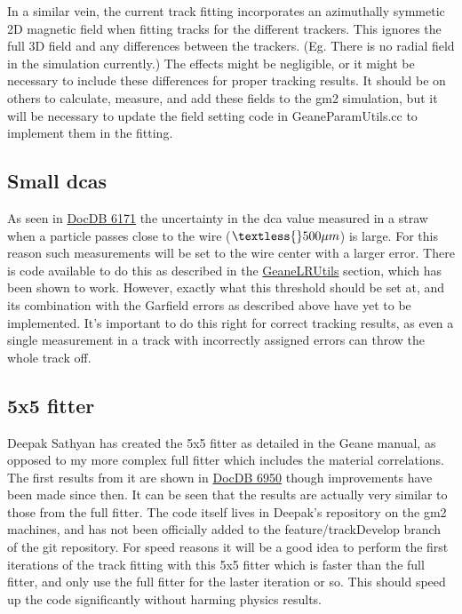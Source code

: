 		In a similar vein, the current track fitting incorporates an azimuthally symmetic 2D magnetic field when fitting tracks for the different trackers. This ignores the full 3D field and any differences between the trackers. (Eg. There is no radial field in the simulation currently.) The effects might be negligible, or it might be necessary to include these differences for proper tracking results. It should be on others to calculate, measure, and add these fields to the gm2 simulation, but it will be necessary to update the field setting code in GeaneParamUtils.cc to implement them in the fitting.

	\subsection{Small dcas}

		As seen in \href{https://gm2-docdb.fnal.gov/cgi-bin/private/ShowDocument?docid=6171}{DocDB 6171} the uncertainty in the dca value measured in a straw when a particle passes close to the wire ($\textless{}500 \mu m$) is large. For this reason such measurements will be set to the wire center with a larger error. There is code available to do this as described in the \hyperref[sec:GeaneLRUtils]{GeaneLRUtils} section, which has been shown to work. However, exactly what this threshold should be set at, and its combination with the Garfield errors as described above have yet to be implemented. It's important to do this right for correct tracking results, as even a single measurement in a track with incorrectly assigned errors can throw the whole track off.

	\subsection{5x5 fitter}

		Deepak Sathyan has created the 5x5 fitter as detailed in the Geane manual, as opposed to my more complex full fitter which includes the material correlations. The first results from it are shown in \href{https://gm2-docdb.fnal.gov/cgi-bin/private/ShowDocument?docid=6950}{DocDB 6950} though improvements have been made since then. It can be seen that the results are actually very similar to those from the full fitter. The code itself lives in Deepak's repository on the gm2 machines, and has not been officially added to the feature/trackDevelop branch of the git repository. For speed reasons it will be a good idea to perform the first iterations of the track fitting with this 5x5 fitter which is faster than the full fitter, and only use the full fitter for the laster iteration or so. This should speed up the code significantly without harming physics results.

